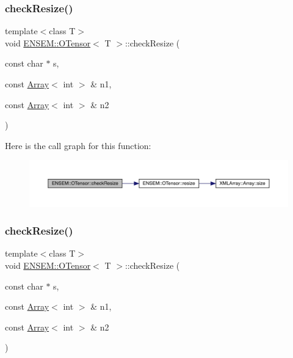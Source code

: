 \subsubsection{\texorpdfstring{checkResize()}{checkResize()}\hspace{0.1cm}{\footnotesize\ttfamily [4/6]}}
{\footnotesize\ttfamily template$<$class T$>$ \\
void \mbox{\hyperlink{classENSEM_1_1OTensor}{E\+N\+S\+E\+M\+::\+O\+Tensor}}$<$ T $>$\+::check\+Resize (\begin{DoxyParamCaption}\item[{const char $\ast$}]{s,  }\item[{const \mbox{\hyperlink{classXMLArray_1_1Array}{Array}}$<$ int $>$ \&}]{n1,  }\item[{const \mbox{\hyperlink{classXMLArray_1_1Array}{Array}}$<$ int $>$ \&}]{n2 }\end{DoxyParamCaption})\hspace{0.3cm}{\ttfamily [inline]}}

Here is the call graph for this function\+:
\nopagebreak
\begin{figure}[H]
\begin{center}
\leavevmode
\includegraphics[width=350pt]{da/d8a/classENSEM_1_1OTensor_a0f656f8ef2b19a258a8c86a4e80ea902_cgraph}
\end{center}
\end{figure}
\mbox{\label{classENSEM_1_1OTensor_a0f656f8ef2b19a258a8c86a4e80ea902}} 
\subsubsection{\texorpdfstring{checkResize()}{checkResize()}\hspace{0.1cm}{\footnotesize\ttfamily [5/6]}}
{\footnotesize\ttfamily template$<$class T$>$ \\
void \mbox{\hyperlink{classENSEM_1_1OTensor}{E\+N\+S\+E\+M\+::\+O\+Tensor}}$<$ T $>$\+::check\+Resize (\begin{DoxyParamCaption}\item[{const char $\ast$}]{s,  }\item[{const \mbox{\hyperlink{classXMLArray_1_1Array}{Array}}$<$ int $>$ \&}]{n1,  }\item[{const \mbox{\hyperlink{classXMLArray_1_1Array}{Array}}$<$ int $>$ \&}]{n2 }\end{DoxyParamCaption})\hspace{0.3cm}{\ttfamily [inline]}}


